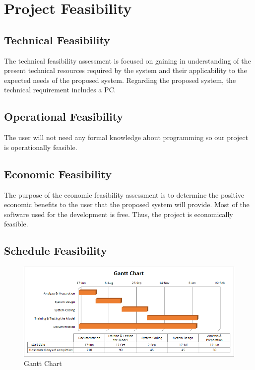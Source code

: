 \section{Project Feasibility}
\vspace{-18pt}
\subsection{Technical Feasibility}
\vspace{-18pt}
The technical feasibility assessment is focused on gaining in understanding of the present technical resources required by the system and their applicability to the expected needs of the proposed system. Regarding the proposed system, the technical requirement includes a PC.
\vspace{-18pt}
\subsection{Operational Feasibility}
\vspace{-18pt}
The user will not need any formal knowledge about programming so our project is operationally feasible.
\vspace{-18pt}
\subsection{Economic Feasibility}
\vspace{-18pt}
The purpose of the economic feasibility assessment is to determine the positive economic benefits to the user that the proposed system will provide. Most of the software used for the development is free. Thus, the project is economically feasible.
\vspace{-18pt}
\subsection{Schedule Feasibility}
\vspace{-18pt}
\begin{figure}[!h] %
\begin{center}
	\includegraphics[width=6in]{images/gc2.png} 
	\caption{Gantt Chart} %
	\label{figGanttChart} %
\end{center}
\end{figure}
